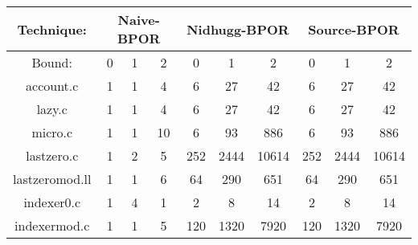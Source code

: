 \begin{center}
\begin{tabular}{ |c|c|c|c|c|c|c|c|c|c|}
\hline
\multicolumn{1}{|c|}{Technique:} & \multicolumn{3}{c|}{Naive-BPOR} & \multicolumn{3}{c|}{Nidhugg-BPOR} & \multicolumn{3}{c|}{Source-BPOR} \\
\hline
Bound: & 0 & 1 & 2 & 0 & 1 & 2 & 0 & 1 & 2 \\
\hline \hline
account.c & 1 & 1 & 4 & 6 & 27 & 42 & 6 & 27 & 42 \\
\hline
lazy.c & 1 & 1 & 4 & 6 & 27 & 42 & 6 & 27 & 42 \\
\hline
micro.c & 1 & 1 & 10 & 6 & 93 & 886 & 6 & 93 & 886 \\
\hline
lastzero.c & 1 & 2 & 5 & 252 & 2444 & 10614 & 252 & 2444 & 10614 \\
\hline
lastzeromod.ll & 1 & 1 & 6 & 64 & 290 & 651 & 64 & 290 & 651 \\
\hline
indexer0.c & 1 & 4 & 1 & 2 & 8 & 14 & 2 & 8 & 14 \\
\hline
indexermod.c & 1 & 1 & 5 & 120 & 1320 & 7920 & 120 & 1320 & 7920 \\
\hline
\end{tabular}
\end{center}
